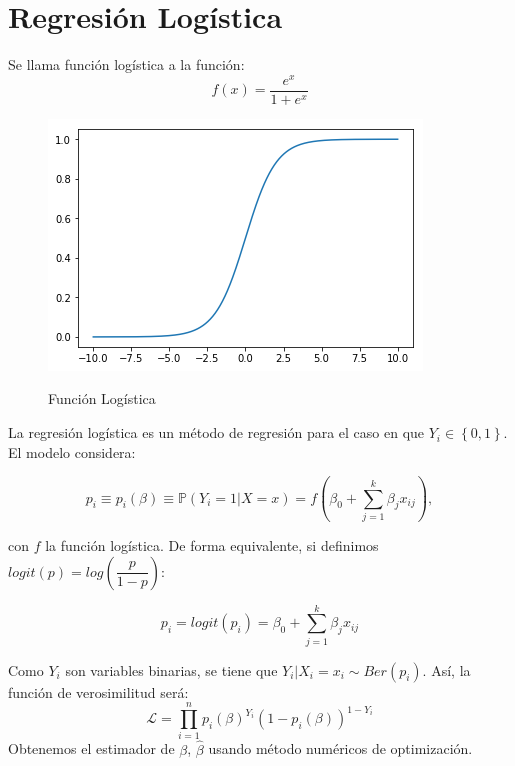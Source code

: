 \section{Regresión Logística}

\begin{definition}
Se llama función logística a la función: 
$$
f(x)=\dfrac{e^x}{1+e^x}
$$
\end{definition}
\begin{figure}[h]
    \centering
    \includegraphics[scale=0.65]{img/funcion_logistica.png}
    \label{fig:logistica}
    \caption{Función Logística}
\end{figure}
La regresión logística es un método de regresión para el caso en que $Y_i \in \left \{0,1 \right \}$. El modelo considera: 

$$
p_i \equiv p_i(\beta) \equiv \mathbb{P}(Y_i=1 | X=x)= f(\beta_0+\sum_{j=1}^{k}\beta_{j} x_{ij}),
$$ 

con $f$ la función logística. De forma equivalente, si definimos $logit(p)=log(\dfrac{p}{1-p})$: 

$$
p_i=logit(p_i)= \beta_0+\sum_{j=1}^{k}\beta_j x_{ij}
$$

Como $Y_i$ son variables binarias, se tiene que   $Y_i|X_i=x_i \sim Ber(p_i)$. Así, la función de verosimilitud será:
$$
\mathcal{L}=\prod_{i=1}^{n} p_i(\beta)^{Y_i}(1-p_i(\beta))^{1-Y_i}
$$
Obtenemos el estimador de $\beta$, $\hat{\beta}$ usando método numéricos de optimización. 